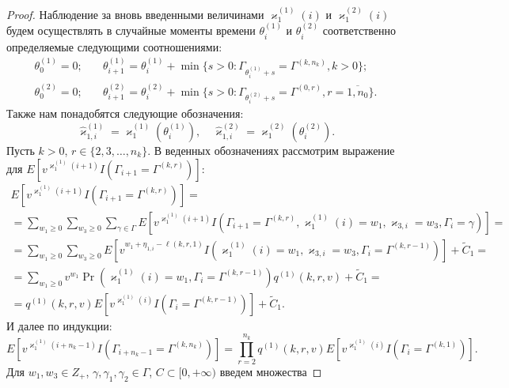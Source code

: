 \begin{proof}
Наблюдение за вновь введенными величинами $\varkappa_{1}^{(1)}(i)$ и $\varkappa_{1}^{(2)}(i)$ будем осуществлять в случайные моменты времени $\theta_{i}^{(1)}$ и $\theta_{i}^{(2)}$ соответственно определяемые следующими соотношениями:
\begin{equation}
\begin{aligned}
  \theta_{0}^{(1)}=0; & \quad \theta_{i+1}^{(1)}=\theta_{i}^{(1)} + \min{\{s>0\colon \Gamma_{\theta_{i}^{(1)}+s} = \Gamma^{(k,n_k)}, k>0\}};\\
  \theta_{0}^{(2)}=0; & \quad  \theta_{i+1}^{(2)}=\theta_{i}^{(2)} + \min{\{s>0\colon \Gamma_{\theta_{i}^{(2)}+s} = \Gamma^{(0,r)}, r=\overline{1,n_0}\}}.
  \label{stop:times}
\end{aligned}
\end{equation}
Также нам понадобятся следующие обозначения:
\begin{equation}
  \hat{\varkappa}_{1,i}^{(1)}=\varkappa_{1}^{(1)}(\theta_{i}^{(1)}), \quad   \hat{\varkappa}_{1,i}^{(2)}=\varkappa_{1}^{(2)}(\theta_{i}^{(2)}).
  \label{stop:queue}
\end{equation}
Пусть $k>0$, $r \in \{2, 3, \ldots, n_k\}$. В веденных обозначениях рассмотрим выражение для $E[v^{\varkappa_{1}^{(1)}(i+1)} I(\Gamma_{i+1}=\Gamma^{(k,r)})]$:
\begin{multline*}
  E[v^{\varkappa_{1}^{(1)}(i+1)} I(\Gamma_{i+1}=\Gamma^{(k,r)})] = \\ =\sum_{w_1 \geqslant 0} \sum_{w_3 \geqslant 0} \sum_{\gamma \in \Gamma} E[v^{\varkappa_{1}^{(1)}(i+1)} I(\Gamma_{i+1}=\Gamma^{(k,r)}, \varkappa_{1}^{(1)}(i)=w_1, \varkappa_{3,i}=w_3,\Gamma_i=\gamma)] =\\= \sum_{w_1\geqslant 0} \sum_{w_3\geqslant 0} E[v^{w_1 + \eta_{1,i}-\ell(k,r,1)} I(\varkappa_{1}^{(1)}(i)=w_1, \varkappa_{3,i}=w_3,\Gamma_i=\Gamma^{(k,r-1)})] + \widetilde{C}_1=\\
  =\sum_{w_1\geqslant 0} v^{w_1 } \Pr (\varkappa_{1}^{(1)}(i)=w_1, \Gamma_i=\Gamma^{(k,r-1)}) q^{(1)}(k,r,v) + \widetilde{C}_1 = \\
  =q^{(1)}(k,r,v) E[v^{\varkappa_{1}^{(1)}(i)} I(\Gamma_i=\Gamma^{(k,r-1)})] + \widetilde{C}_1.
\end{multline*}
И далее по индукции:
\begin{equation*}
  E[v^{\varkappa_{1}^{(1)}(i+n_k-1)} I(\Gamma_{i+n_k-1}=\Gamma^{(k,n_k)})] = \prod_{r=2}^{n_k} q^{(1)}(k,r,v) E[v^{\varkappa_{1}^{(1)}(i)} I(\Gamma_{i}=\Gamma^{(k,1)})].
\end{equation*}
Для $w_1, w_3 \in Z_+$, $\gamma, \gamma_1, \gamma_2 \in \Gamma$, $C \subset [0, +\infty)$ введем множества 

\end{proof}
